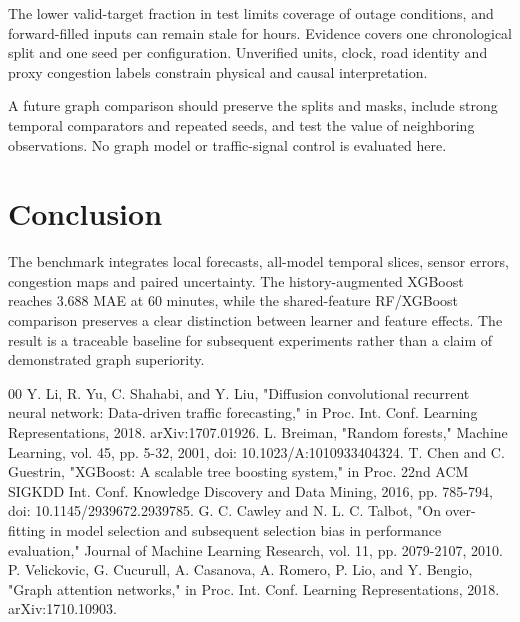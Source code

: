 \documentclass[conference]{IEEEtran}
\begin{document}
The lower valid-target fraction in test limits coverage of outage conditions, and forward-filled inputs can remain stale for hours. Evidence covers one chronological split and one seed per configuration. Unverified units, clock, road identity and proxy congestion labels constrain physical and causal interpretation.

A future graph comparison should preserve the splits and masks, include strong temporal comparators and repeated seeds, and test the value of neighboring observations. No graph model or traffic-signal control is evaluated here.

\section{Conclusion}
The benchmark integrates local forecasts, all-model temporal slices, sensor errors, congestion maps and paired uncertainty. The history-augmented XGBoost reaches 3.688 MAE at 60 minutes, while the shared-feature RF/XGBoost comparison preserves a clear distinction between learner and feature effects. The result is a traceable baseline for subsequent experiments rather than a claim of demonstrated graph superiority.

\begin{thebibliography}{00}
 Y. Li, R. Yu, C. Shahabi, and Y. Liu, "Diffusion convolutional recurrent neural network: Data-driven traffic forecasting," in Proc. Int. Conf. Learning Representations, 2018. arXiv:1707.01926.
 L. Breiman, "Random forests," Machine Learning, vol. 45, pp. 5-32, 2001, doi: 10.1023/A:1010933404324.
 T. Chen and C. Guestrin, "XGBoost: A scalable tree boosting system," in Proc. 22nd ACM SIGKDD Int. Conf. Knowledge Discovery and Data Mining, 2016, pp. 785-794, doi: 10.1145/2939672.2939785.
 G. C. Cawley and N. L. C. Talbot, "On over-fitting in model selection and subsequent selection bias in performance evaluation," Journal of Machine Learning Research, vol. 11, pp. 2079-2107, 2010.
 P. Velickovic, G. Cucurull, A. Casanova, A. Romero, P. Lio, and Y. Bengio, "Graph attention networks," in Proc. Int. Conf. Learning Representations, 2018. arXiv:1710.10903.
\end{thebibliography}
\end{document}
